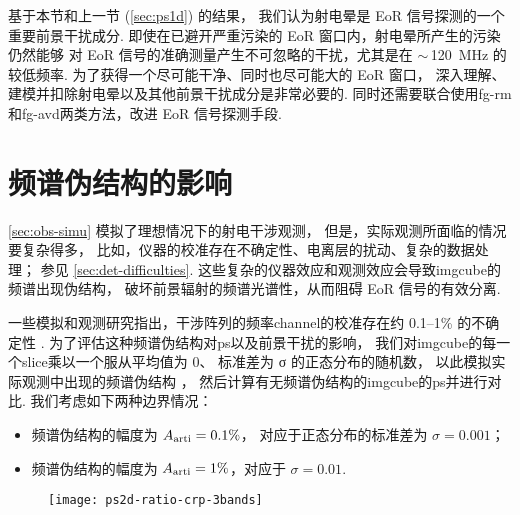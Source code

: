 基于本节和上一节 (\autoref{sec:ps1d}) 的结果，
我们认为射电晕是 EoR 信号探测的一个重要前景干扰成分.
即使在已避开严重污染的 EoR 窗口内，射电晕所产生的污染仍然能够
对 EoR 信号的准确测量产生不可忽略的干扰，尤其是在 $\sim$\,\SI{120}{\MHz} 的较低频率.
为了获得一个尽可能干净、同时也尽可能大的 EoR 窗口，
深入理解、建模并扣除射电晕以及其他前景干扰成分是非常必要的.
同时还需要联合使用\ac{fg-rm}和\ac{fg-avd}两类方法，改进 EoR 信号探测手段.


\section{频谱伪结构的影响}
\label{sec:freq-artifacts}

\autoref{sec:obs-simu} 模拟了理想情况下的射电干涉观测，
但是，实际观测所面临的情况要复杂得多，
比如，仪器的校准存在不确定性、电离层的扰动、复杂的数据处理；
参见 \autoref{sec:det-difficulties}.
这些复杂的仪器效应和观测效应会导致\ac{imgcube}的频谱出现伪结构，
破坏前景辐射的频谱光谱性，从而阻碍 EoR 信号的有效分离.

一些模拟和观测研究指出，干涉阵列的频率\ac{channel}的校准存在约
\numrange{0.1}{1}\% 的不确定性
\cite{barry2016,beardsley2016,ewallWice2017}.
为了评估这种频谱伪结构对\ac{ps}以及前景干扰的影响，
我们对\ac{imgcube}的每一个\ac{slice}乘以一个服从平均值为 0、
标准差为 σ 的正态分布的随机数，
以此模拟实际观测中出现的频谱伪结构 \cite{chapman2016}，
然后计算有无频谱伪结构的\ac{imgcube}的\ac{ps}并进行对比.
我们考虑如下两种边界情况：
\begin{itemize}
  \item 频谱伪结构的幅度为 $A_{\mathrm{arti}} = 0.1\%$，
    对应于正态分布的标准差为 $σ = 0.001$；
  \item 频谱伪结构的幅度为 $A_{\mathrm{arti}} = 1\%$，对应于 $σ = 0.01$.
\end{itemize}

\begin{figure}[htp]
  \centering
  \texttt{[image: ps2d-ratio-crp-3bands]}
  \label{fig:ps2d-ratio-crp}
\end{figure}

